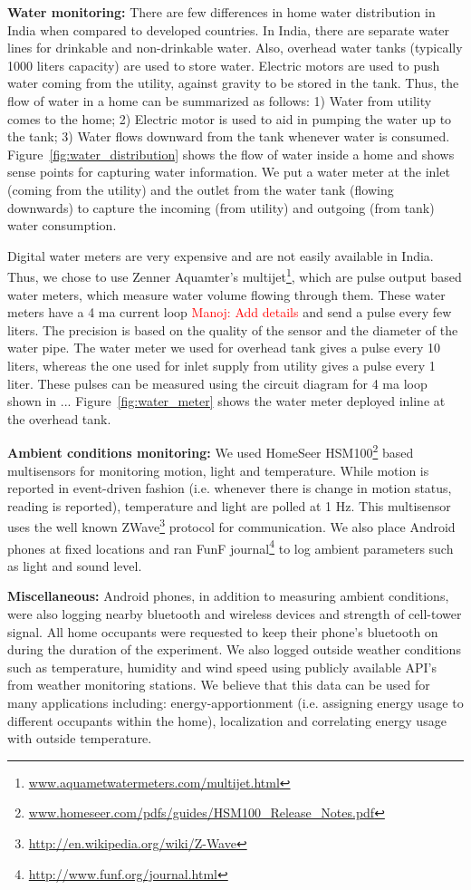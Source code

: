 \documentclass[10pt]{sensys-proc}
\newcommand{\redcolor}[1]{\textcolor{red}{#1}}
\newcommand{\figref}[1]{Figure~\ref{#1}}
\begin{document}
\noindent \textbf{Water monitoring:} There are few differences in home water distribution in India when compared to developed countries. In India, there are separate water lines for drinkable and non-drinkable water. Also, overhead water tanks (typically 1000 liters capacity) are used to store water. Electric motors are used to push water coming from the utility, against gravity to be stored in the tank. Thus, the flow of water in a home can be summarized as follows: 1) Water from utility comes to the home; 2) Electric motor is used to aid in pumping the water up to the tank; 3) Water flows downward from the tank whenever water is consumed. \figref{fig:water_distribution} shows the flow of water inside a home and shows sense points for capturing water information. We put a water meter at the inlet (coming from the utility) and the outlet from the water tank (flowing downwards) to capture the incoming (from utility) and outgoing (from tank) water consumption. 


Digital water meters are very expensive and are not easily available in India. Thus, we chose to use Zenner Aquamter's multijet\footnote{\url{www.aquametwatermeters.com/multijet.html}}, which are pulse output based water meters, which measure water volume flowing through them. These water meters have a 4 ma current loop \redcolor{Manoj: Add details} and send a pulse every few liters. The precision is based on the quality of the sensor and the diameter of the water pipe. The water meter we used for overhead tank gives a pulse every 10 liters, whereas the one used for inlet supply from utility gives a pulse every 1 liter. These pulses can be measured using the circuit diagram for 4 ma loop shown in ... \figref{fig:water_meter} shows the water meter deployed inline at the overhead tank.

\noindent \textbf{Ambient conditions monitoring:} We used HomeSeer HSM100\footnote{\url{www.homeseer.com/pdfs/guides/HSM100_Release_Notes.pdf}} based multisensors for monitoring motion, light and temperature. While motion is reported in event-driven fashion (i.e. whenever there is change in motion status, reading is reported), temperature and light are polled at 1 Hz. This multisensor uses the well known ZWave\footnote{\url{http://en.wikipedia.org/wiki/Z-Wave}} protocol for communication. We also place Android phones at fixed locations and ran FunF journal\footnote{\url{http://www.funf.org/journal.html}} to log ambient parameters such as light and  sound level.

\noindent \textbf{Miscellaneous:} Android phones, in addition to measuring ambient conditions, were also logging nearby bluetooth and wireless devices and strength of cell-tower signal. All home occupants were requested to keep their phone's bluetooth on during the duration of the experiment. We also logged outside weather conditions such as temperature, humidity and wind speed using publicly available API's from weather monitoring stations. We believe that this data can be used for many applications including: energy-apportionment (i.e. assigning energy usage to different occupants within the home), localization and correlating energy usage with outside temperature.
\end{document}
